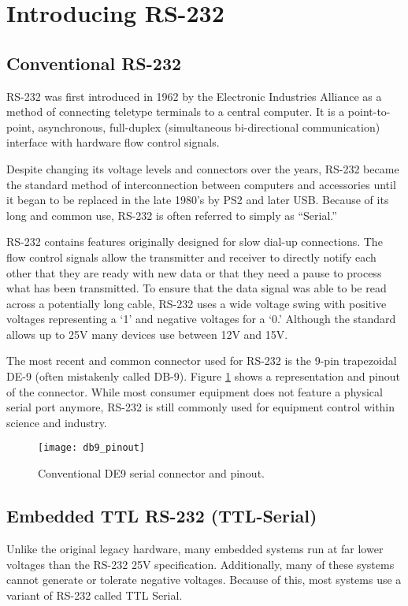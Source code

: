 \documentclass[11pt,fleqn]{book} %
\begin{document}
\section{Introducing RS-232}
\subsection{Conventional RS-232}
RS-232 was first introduced in 1962 by the Electronic Industries Alliance as a method of connecting teletype terminals to a central computer. It is a point-to-point, asynchronous, full-duplex (simultaneous bi-directional communication) interface with hardware flow control signals. 

Despite changing its voltage levels and connectors over the years, RS-232 became the standard method of interconnection between computers and accessories until it began to be replaced in the late 1980's by PS2 and later USB. Because of its long and common use, RS-232 is often referred to simply as ``Serial.'' 

RS-232 contains features originally designed for slow dial-up connections. The flow control signals allow the transmitter and receiver to directly notify each other that they are ready with new data or that they need a pause to process what has been transmitted. To ensure that the data signal was able to be read across a potentially long cable, RS-232 uses a wide voltage swing with positive voltages representing a `1' and negative voltages for a `0.' Although the standard allows up to {\textpm}25V many devices use between {\textpm}12V and {\textpm}15V.

The most recent and common connector used for RS-232 is the 9-pin trapezoidal DE-9 (often mistakenly called DB-9). Figure \ref{db9_pinout} shows a representation and pinout of the connector. While most consumer equipment does not feature a physical serial port anymore, RS-232 is still commonly used for equipment control within science and industry.  


\begin{figure}[]
    \centering\texttt{[image: db9\_pinout]}
    \caption{Conventional DE9 serial connector and pinout.}
    \label{db9_pinout}
\end{figure} 

\subsection{Embedded TTL RS-232 (TTL-Serial)}
Unlike the original legacy hardware, many embedded systems run at far lower voltages than the  RS-232 {\textpm}25V specification. Additionally, many of these systems cannot generate or tolerate negative voltages. Because of this, most systems use a variant of RS-232 called TTL Serial.
\end{document}
